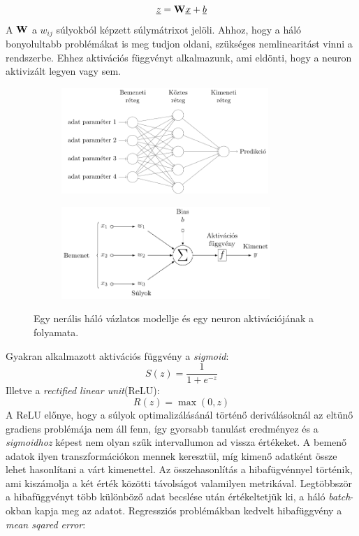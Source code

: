 \documentclass[12pt,letterpaper,oneside,openright]{book}
\begin{document}
\begin{equation}
\underline{z} = \bold{W}\underline x +\underline{b}
\end{equation}
A $\bold{W}$ a $w_{ij}$ súlyokból képzett súlymátrixot jelöli. Ahhoz, hogy a háló bonyolultabb problémákat is meg tudjon oldani, szükséges nemlinearitást vinni a rendszerbe. Ehhez  aktivációs függvényt alkalmazunk, ami eldönti, hogy a neuron aktivizált legyen vagy sem.  
\begin{figure}[]
\centering
\hspace{-2.8 cm}
\begin{subfigure}[b]{0.3\textwidth}
\includegraphics[height=40mm]{Figures/fig1.pdf}
\end{subfigure}\hspace{3.5 cm}
\begin{subfigure}[b]{0.3\textwidth}
\includegraphics[height=35mm]{figures/fig2.pdf}
\end{subfigure}
\caption[Neurális háló vázlatos modellje]{Egy nerális háló vázlatos modellje és egy neuron aktivációjának a folyamata.}

\end{figure}
Gyakran alkalmazott aktivációs függvény a \textit{sigmoid}:
\begin{equation}
S(z) = \frac{1}{1 + e^{-z}}
\end{equation}
Illetve a \textit{rectified linear unit}(ReLU):
\begin{equation}
R(z) = \max{(0, z)}
\end{equation}
A ReLU előnye, hogy a súlyok optimalizálásánál történő deriválásoknál az eltünő gradiens problémája nem áll fenn, így gyorsabb tanulást eredményez és a \textit{sigmoidhoz} képest nem olyan szűk intervallumon ad vissza értékeket. A bemenő adatok ilyen transzformációkon mennek keresztül, míg kimenő adatként össze lehet hasonlítani a várt kimenettel. Az összehasonlítás a hibafügvénnyel történik, ami kiszámolja a két érték közötti távolságot valamilyen metrikával. Legtöbbször a hibafüggvényt több különböző adat becslése után értékeltetjük ki, a háló \textit{batch}-okban kapja meg az adatot. Regressziós problémákban kedvelt hibafüggvény a \textit{mean sqared error}:
\end{document}
